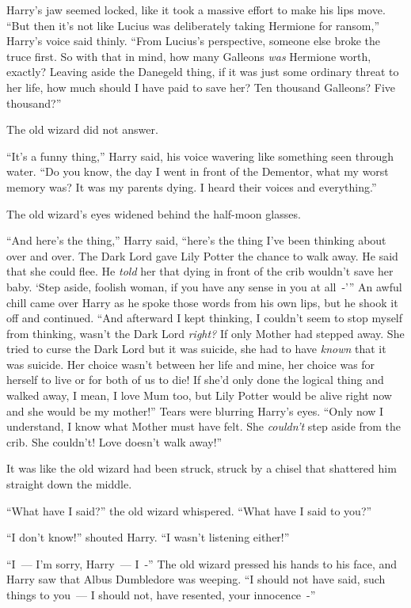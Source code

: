 Harry's jaw seemed locked, like it took a massive effort to make his lips move. ``But then it's not like Lucius was deliberately taking Hermione for ransom,'' Harry's voice said thinly. ``From Lucius's perspective, someone else broke the truce first. So with that in mind, how many Galleons \emph{was} Hermione worth, exactly? Leaving aside the Danegeld thing, if it was just some ordinary threat to her life, how much should I have paid to save her? Ten thousand Galleons? Five thousand?''

The old wizard did not answer.

``It's a funny thing,'' Harry said, his voice wavering like something seen through water. ``Do you know, the day I went in front of the Dementor, what my worst memory was? It was my parents dying. I heard their voices and everything.''

The old wizard's eyes widened behind the half-moon glasses.

``And here's the thing,'' Harry said, ``here's the thing I've been thinking about over and over. The Dark Lord gave Lily Potter the chance to walk away. He said that she could flee. He \emph{told} her that dying in front of the crib wouldn't save her baby. `Step aside, foolish woman, if you have any sense in you at all~-''' An awful chill came over Harry as he spoke those words from his own lips, but he shook it off and continued. ``And afterward I kept thinking, I couldn't seem to stop myself from thinking, wasn't the Dark Lord \emph{right?} If only Mother had stepped away. She tried to curse the Dark Lord but it was suicide, she had to have \emph{known} that it was suicide. Her choice wasn't between her life and mine, her choice was for herself to live or for both of us to die! If she'd only done the logical thing and walked away, I mean, I love Mum too, but Lily Potter would be alive right now and she would be my mother!'' Tears were blurring Harry's eyes. ``Only now I understand, I know what Mother must have felt. She \emph{couldn't} step aside from the crib. She couldn't! Love doesn't walk away!''

It was like the old wizard had been struck, struck by a chisel that shattered him straight down the middle.

``What have I said?'' the old wizard whispered. ``What have I said to you?''

``I don't know!'' shouted Harry. ``I wasn't listening either!''

``I~--- I'm sorry, Harry~--- I~-'' The old wizard pressed his hands to his face, and Harry saw that Albus Dumbledore was weeping. ``I should not have said, such things to you~--- I should not, have resented, your innocence~-''

